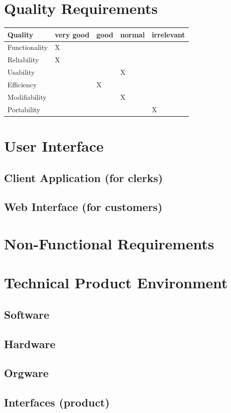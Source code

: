 \documentclass[11pt,a4paper,oneside,svgnames]{report}
\begin{document}
\chapter{Quality Requirements}
\begin{table}[h!]
 \begin{tabular}{lllll}
  \hline
  Quality & very good & good & normal & irrelevant \\
  \hline
  Functionality & X & & & \\
  Reliability & X & & & \\
  Usability & & & X & \\
  Efficiency & & X & & \\
  Modifiability & & & X & \\
  Portability & & & & X \\
  \hline
 \end{tabular}
\end{table}

\chapter{User Interface}
\section{Client Application (for clerks)}
\section{Web Interface (for customers)}

\chapter{Non-Functional Requirements}
\chapter{Technical Product Environment}
\section{Software}
\section{Hardware}
\section{Orgware}
\section{Interfaces (product)}
\end{document}
